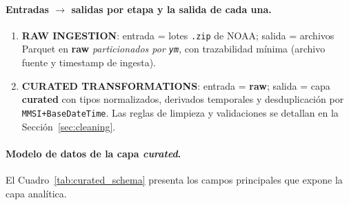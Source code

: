 \documentclass[10pt]{article}
\begin{document}
\paragraph{Entradas $\rightarrow$ salidas por etapa y la salida de cada una.}
\begin{enumerate}
  \item \textbf{RAW INGESTION}: entrada = lotes \texttt{.zip} de NOAA; salida = archivos Parquet en \textbf{raw} \emph{particionados por \texttt{ym}}, con trazabilidad mínima (archivo fuente y timestamp de ingesta).
  \item \textbf{CURATED TRANSFORMATIONS}: entrada = \textbf{raw}; salida = capa \textbf{curated} con tipos normalizados, derivados temporales y desduplicación por \texttt{MMSI+BaseDateTime}. Las reglas de limpieza y validaciones se detallan en la Sección~\ref{sec:cleaning}.
\end{enumerate}

\paragraph{Modelo de datos de la capa \textit{curated}.}
El Cuadro~\ref{tab:curated_schema} presenta los campos principales que expone la capa analítica.
\end{document}
